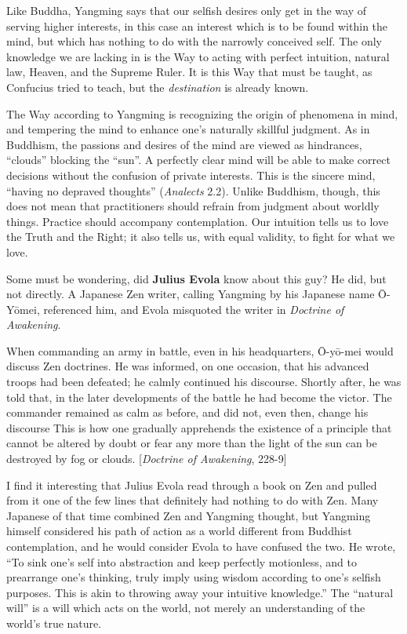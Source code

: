 Like Buddha, Yangming says that our selfish desires only get in the way of serving higher interests, in this case an interest which is to be found within the mind, but which has nothing to do with the narrowly conceived self. The only knowledge we are lacking in is the Way to acting with perfect intuition, natural law, Heaven, and the Supreme Ruler. It is this Way that must be taught, as Confucius tried to teach, but the \emph{destination} is already known.

The Way according to Yangming is recognizing the origin of phenomena in mind, and tempering the mind to enhance one's naturally skillful judgment. As in Buddhism, the passions and desires of the mind are viewed as hindrances, “clouds” blocking the “sun”. A perfectly clear mind will be able to make correct decisions without the confusion of private interests. This is the sincere mind, “having no depraved thoughts” (\emph{Analects} 2.2). Unlike Buddhism, though, this does not mean that practitioners should refrain from judgment about worldly things. Practice should accompany contemplation. Our intuition tells us to love the Truth and the Right; it also tells us, with equal validity, to fight for what we love.

Some must be wondering, did \textbf{Julius Evola} know about this guy? He did, but not directly. A Japanese Zen writer, calling Yangming by his Japanese name Ō-Yōmei, referenced him, and Evola misquoted the writer in \emph{Doctrine of Awakening}.

\begin{quotex}
When commanding an army in battle, even in his headquarters, Ō-yō-mei would discuss Zen doctrines. He was informed, on one occasion, that his advanced troops had been defeated; he calmly continued his discourse. Shortly after, he was told that, in the later developments of the battle he had become the victor. The commander remained as calm as before, and did not, even then, change his discourse This is how one gradually apprehends the existence of a principle that cannot be altered by doubt or fear any more than the light of the sun can be destroyed by fog or clouds. [\emph{Doctrine of Awakening}, 228-9]

\end{quotex}
I find it interesting that Julius Evola read through a book on Zen and pulled from it one of the few lines that definitely had nothing to do with Zen. Many Japanese of that time combined Zen and Yangming thought, but Yangming himself considered his path of action as a world different from Buddhist contemplation, and he would consider Evola to have confused the two. He wrote, “To sink one's self into abstraction and keep perfectly motionless, and to prearrange one's thinking, truly imply using wisdom according to one's selfish purposes. This is akin to throwing away your intuitive knowledge.” The “natural will” is a will which acts on the world, not merely an understanding of the world's true nature.

